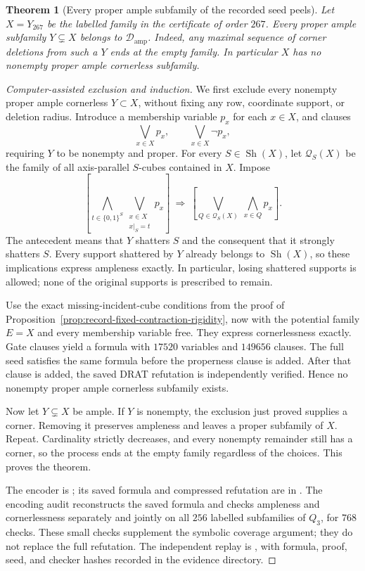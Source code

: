 \documentclass[11pt]{article}
\numberwithin{equation}{section}
\newtheorem{theorem}{Theorem}[section]
\theoremstyle{definition}
\theoremstyle{remark}
\newcommand{\Damp}{\mathcal D_{\mathrm{amp}}}
\newcommand{\Sh}{\operatorname{Sh}}
\begin{document}
\begin{theorem}[Every proper ample subfamily of the recorded seed peels]
\label{thm:record267-ample-inclusion-minimality}
Let $X=Y_{267}$ be the labelled family in the certificate of order $267$.
Every proper ample subfamily $Y\subsetneq X$ belongs to $\Damp$.
Indeed, any maximal sequence of corner deletions from such a $Y$ ends
at the empty family. In particular $X$ has no nonempty proper ample
cornerless subfamily.
\end{theorem}
\begin{proof}[Computer-assisted exclusion and induction]
We first exclude every nonempty proper ample cornerless $Y\subset X$,
without fixing any row, coordinate support, or deletion radius.
Introduce a membership variable $p_x$ for each $x\in X$, and clauses
\[
 \bigvee_{x\in X}p_x,\qquad \bigvee_{x\in X}\neg p_x,
\]
requiring $Y$ to be nonempty and proper. For every $S\in\Sh(X)$,
let $\mathcal Q_S(X)$ be the family of all axis-parallel $S$-cubes
contained in $X$. Impose
\[
 \left[\bigwedge_{t\in\{0,1\}^S}
       \bigvee_{\substack{x\in X\\x|_S=t}}p_x\right]
 \ \Longrightarrow\
 \left[\bigvee_{Q\in\mathcal Q_S(X)}\ \bigwedge_{x\in Q}p_x\right].
\]
The antecedent means that $Y$ shatters $S$ and the consequent that it
strongly shatters $S$. Every support shattered by $Y$ already belongs
to $\Sh(X)$, so these implications express ampleness exactly. In
particular, losing shattered supports is allowed; none of the original
supports is prescribed to remain.

Use the exact missing-incident-cube conditions from the proof of
Proposition~\ref{prop:record-fixed-contraction-rigidity}, now with the
potential family $E=X$ and every membership variable free. They express
cornerlessness exactly. Gate clauses yield a formula with $17520$
variables and $149656$ clauses. The full seed satisfies the same formula
before the properness clause is added. After that clause is added,
the saved DRAT refutation is independently verified. Hence no nonempty
proper ample cornerless subfamily exists.

Now let $Y\subsetneq X$ be ample. If $Y$ is nonempty, the exclusion
just proved supplies a corner. Removing it preserves ampleness and
leaves a proper subfamily of $X$. Repeat. Cardinality strictly decreases,
and every nonempty remainder still has a corner, so the process ends
at the empty family regardless of the choices. This proves the theorem.

The encoder is ; its
saved formula and compressed refutation are in
. The encoding audit
 reconstructs the
saved formula and checks ampleness and cornerlessness separately and
jointly on all $256$ labelled subfamilies of $Q_3$, for $768$ checks.
These small checks supplement the symbolic coverage argument; they do
not replace the full refutation. The independent replay is
, with formula, proof, seed,
and checker hashes recorded in the evidence directory.
\end{proof}
\end{document}

